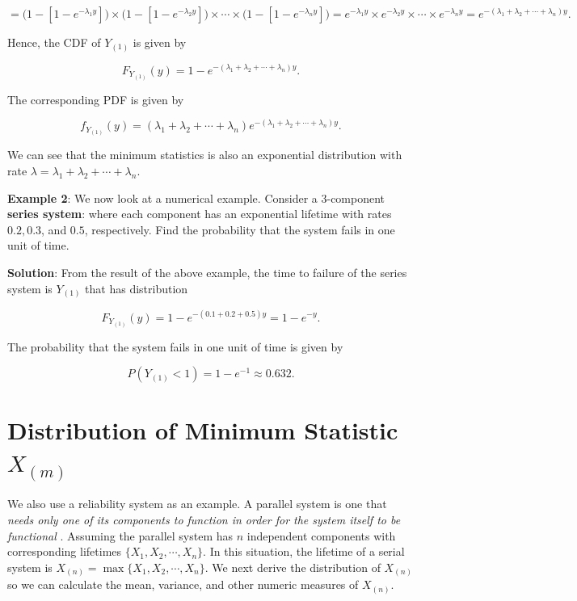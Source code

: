 \documentclass[
]{book}
\begin{document}
\[
= \big(1-[1-e^{-\lambda_1y}]\big) \times \big( 1-[1-e^{-\lambda_2y}]\big) \times  \cdots \times \big( 1- [1-e^{-\lambda_ny}] \big) = e^{-\lambda_1y}\times e^{-\lambda_2y}\times  \cdots \times e^{-\lambda_ny} = e^{-(\lambda_1 + \lambda_2 + \cdots + \lambda_n)y}.
\]

Hence, the CDF of \(Y_{(1)}\) is given by

\[
F_{Y_{(1)}}(y) = 1 - e^{-(\lambda_1 + \lambda_2 + \cdots + \lambda_n)y}.
\]

The corresponding PDF is given by

\[
f_{Y_{(1)}}(y) = (\lambda_1 + \lambda_2 + \cdots + \lambda_n) e^{-(\lambda_1 + \lambda_2 + \cdots + \lambda_n)y}.
\]

We can see that the minimum statistics is also an exponential distribution with rate \(\lambda = \lambda_1 + \lambda_2 + \cdots + \lambda_n\).

\textbf{\color{red}Example 2}: We now look at a numerical example. Consider a 3-component \textbf{series system}: where each component has an exponential lifetime with rates \(0.2, 0.3\), and \(0.5\), respectively. Find the probability that the system fails in one unit of time.

\textbf{Solution}: From the result of the above example, the time to failure of the series system is \(Y_{(1)}\) that has distribution

\[
F_{Y_{(1)}} (y) = 1 - e^{-(0.1 + 0.2 + 0.5)y} = 1 - e^{-y}.
\]

The probability that the system fails in one unit of time is given by

\[
P(Y_{(1)} < 1) = 1-e^{-1} \approx 0.632.
\]

\hypertarget{distribution-of-minimum-statistic-x_m}{%
\section{\texorpdfstring{Distribution of Minimum Statistic \textbf{\(X_{(m)}\)}}{Distribution of Minimum Statistic X\_\{(m)\}}}\label{distribution-of-minimum-statistic-x_m}}

We also use a reliability system as an example. A parallel system is one that \emph{\color{red}needs only one of its components to function in order for the system itself to be functional} . Assuming the parallel system has \(n\) independent components with corresponding lifetimes \(\{ X_1, X_2, \cdots, X_n \}\). In this situation, the lifetime of a serial system is \(X_{(n)} = \max \{X_1, X_2, \cdots, X_n \}\). We next derive the distribution of \(X_{(n)}\) so we can calculate the mean, variance, and other numeric measures of \(X_{(n)}\).
\end{document}

